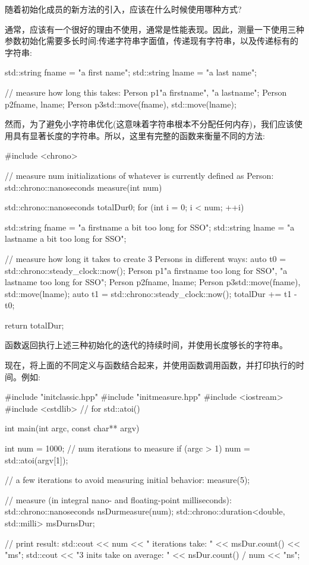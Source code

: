 随着初始化成员的新方法的引入，应该在什么时候使用哪种方式?

通常，应该有一个很好的理由不使用，通常是性能表现。因此，测量一下使用三种参数初始化需要多长时间:传递字符串字面值，传递现有字符串，以及传递标有的字符串:

\begin{cppcode}
std::string fname = "a first name";
std::string lname = "a last name";

// measure how long this takes:
Person p1{"a firstname", "a lastname"};
Person p2{fname, lname};
Person p3{std::move(fname), std::move(lname)};
\end{cppcode}

然而，为了避免小字符串优化(这意味着字符串根本不分配任何内存)，我们应该使用具有显著长度的字符串。所以，这里有完整的函数来衡量不同的方法:

\begin{cppcode}
#include <chrono>

// measure num initializations of whatever is currently defined as Person:
std::chrono::nanoseconds measure(int num)
{
	std::chrono::nanoseconds totalDur{0};
	for (int i = 0; i < num; ++i) {
		std::string fname = "a firstname a bit too long for SSO";
		std::string lname = "a lastname a bit too long for SSO";

		// measure how long it takes to create 3 Persons in different ways:
		auto t0 = std::chrono::steady_clock::now();
		Person p1{"a firstname too long for SSO", "a lastname too long for SSO"};
		Person p2{fname, lname};
		Person p3{std::move(fname), std::move(lname)};
		auto t1 = std::chrono::steady_clock::now();
		totalDur += t1 - t0;
	}
	return totalDur;
}
\end{cppcode}

函数返回执行上述三种初始化的迭代的持续时间，并使用长度够长的字符串。

现在，将上面的不同定义与函数结合起来，并使用函数调用函数，并打印执行的时间。例如:

\begin{cppcode}
#include "initclassic.hpp"
#include "initmeasure.hpp"
#include <iostream>
#include <cstdlib> // for std::atoi()

int main(int argc, const char** argv)
{
	int num = 1000; // num iterations to measure
	if (argc > 1) {
		num = std::atoi(argv[1]);
	}

	// a few iterations to avoid measuring initial behavior:
	measure(5);

	// measure (in integral nano- and floating-point milliseconds):
	std::chrono::nanoseconds nsDur{measure(num)};
	std::chrono::duration<double, std::milli> msDur{nsDur};

	// print result:
	std::cout << num << " iterations take: "
	<< msDur.count() << "ms\n";
	std::cout << "3 inits take on average: "
	<< nsDur.count() / num << "ns\n";
}
\end{cppcode}

